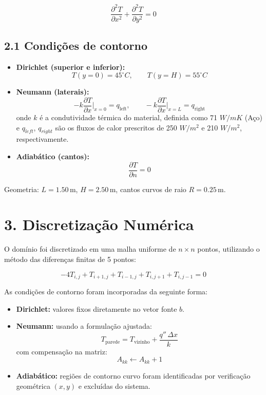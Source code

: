 \documentclass[12pt]{article}
\begin{document}
\begin{equation}
\frac{\partial^2 T}{\partial x^2} + \frac{\partial^2 T}{\partial y^2} = 0
\end{equation}

\subsection*{2.1 Condições de contorno}

\begin{itemize}
    \item \textbf{Dirichlet (superior e inferior):}
    \[
    T(y=0) = 45^\circ C, \qquad T(y=H) = 55^\circ C
    \]
    \item \textbf{Neumann (laterais):}
    \[
    -k \frac{\partial T}{\partial x}\bigg|_{x=0} = q_{\text{left}}, 
    \qquad 
    -k \frac{\partial T}{\partial x}\bigg|_{x=L} = q_{\text{right}}
    \]
    onde $k$ é a condutividade térmica do material, definida como 71 $W/mK$ (Aço) e $q_{left}$, $q_{right}$ são os fluxos de calor prescritos de 250 $W/m^2$ e 210 $W/m^2$, respectivamente.
    \item \textbf{Adiabático (cantos):}
    \[
    \frac{\partial T}{\partial n} = 0
    \]
\end{itemize}

Geometria: $L = 1.50\,\mathrm{m}$, $H = 2.50\,\mathrm{m}$, cantos curvos de raio $R = 0.25\,\mathrm{m}$.

\section*{3. Discretização Numérica}

O domínio foi discretizado em uma malha uniforme de $n \times n$ pontos, utilizando o método das diferenças finitas de 5 pontos:

\begin{equation}
-4T_{i,j} + T_{i+1,j} + T_{i-1,j} + T_{i,j+1} + T_{i,j-1} = 0
\end{equation}

As condições de contorno foram incorporadas da seguinte forma:
\begin{itemize}
    \item \textbf{Dirichlet:} valores fixos diretamente no vetor fonte $b$.
    \item \textbf{Neumann:} usando a formulação ajustada:
    \[
    T_{\text{parede}} = T_{\text{vizinho}} + \frac{q'' \, \Delta x}{k}
    \]
    com compensação na matriz:
    \[
    A_{kk} \leftarrow A_{kk} + 1
    \]
    \item \textbf{Adiabático:} regiões de contorno curvo foram identificadas por verificação geométrica $(x,y)$ e excluídas do sistema.
\end{itemize}
\end{document}
